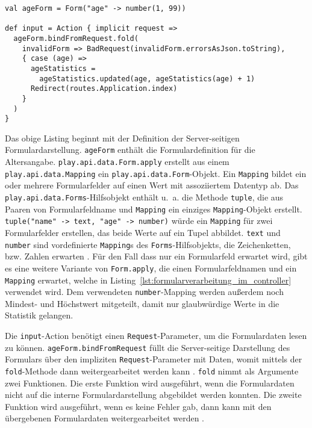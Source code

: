 \begin{lstlisting}[caption=Formularverarbeitung im Controller, label=lst:formularverarbeitung_im_controller]
val ageForm = Form("age" -> number(1, 99))

def input = Action { implicit request =>
  ageForm.bindFromRequest.fold(
    invalidForm => BadRequest(invalidForm.errorsAsJson.toString),
    { case (age) =>
      ageStatistics =
        ageStatistics.updated(age, ageStatistics(age) + 1)
      Redirect(routes.Application.index)
    }
  )
}
\end{lstlisting}

Das obige Listing beginnt mit der Definition der Server-seitigen Formulardarstellung.
\lstinline|ageForm| enthält die Formulardefinition für die Altersangabe.
\lstinline|play.api.data.Form.apply| erstellt aus einem \lstinline|play.api.data.Mapping| ein \lstinline|play.api.data.Form|-Objekt.
Ein \lstinline|Mapping| bildet ein oder mehrere Formularfelder auf einen Wert mit assoziiertem Datentyp ab.
Das \lstinline|play.api.data.Forms|-Hilfsobjekt enthält u.~a. die Methode \lstinline|tuple|, die aus Paaren von Formularfeldname und \lstinline|Mapping| ein einziges \lstinline|Mapping|-Objekt erstellt.
\lstinline|tuple("name" -> text, "age" -> number)| würde ein \lstinline|Mapping| für zwei Formularfelder erstellen, das beide Werte auf ein Tupel abbildet.
\lstinline|text| und \lstinline|number| sind vordefinierte \lstinline|Mapping|s des \lstinline|Forms|-Hilfsobjekts, die Zeichenketten, bzw. Zahlen erwarten \cite[vgl.][S~174--175]{play_for_scala}.
Für den Fall dass nur ein Formularfeld erwartet wird, gibt es eine weitere Variante von \lstinline|Form.apply|, die einen Formularfeldnamen und ein \lstinline|Mapping| erwartet, welche in Listing~\ref{lst:formularverarbeitung_im_controller} verwendet wird.
Dem verwendeten \lstinline|number|-Mapping werden außerdem noch Mindest- und Höchstwert mitgeteilt, damit nur glaubwürdige Werte in die Statistik gelangen.

Die \lstinline|input|-Action benötigt einen \lstinline|Request|-Parameter, um die Formulardaten lesen zu können.
\lstinline|ageForm.bindFromRequest| füllt die Server-seitige Darstellung des Formulars über den impliziten \lstinline|Request|-Parameter mit Daten, womit mittels der \lstinline|fold|-Methode dann weitergearbeitet werden kann \cite[vgl.][S.~179]{play_for_scala}.
\lstinline|fold| nimmt als Argumente zwei Funktionen.
Die erste Funktion wird ausgeführt, wenn die Formulardaten nicht auf die interne Formulardarstellung abgebildet werden konnten.
Die zweite Funktion wird ausgeführt, wenn es keine Fehler gab, dann kann mit den übergebenen Formulardaten weitergearbeitet werden \cite[vgl.][S.~176]{play_for_scala}.


